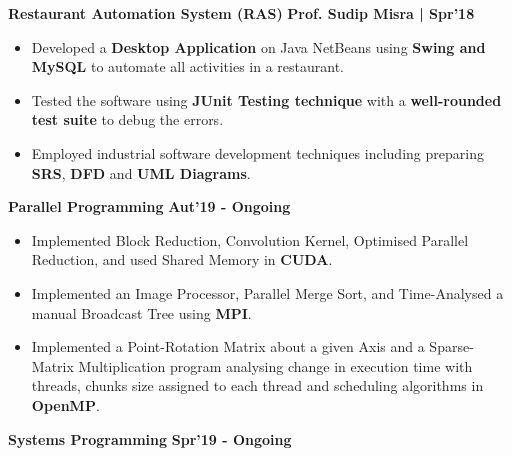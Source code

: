\documentclass[10pt]{article}
\begin{document}
\vspace{-0.2ex}
\large {\textbf{Restaurant Automation System (RAS)}} \normalsize \href{https://github.com/shmundhra/Restaurant-Automation-System} {\hspace{0.5ex}\faGithub} {\hfill} \textbf{Prof. Sudip Misra | Spr'18}\\[-1.75em]
\begin{itemize}
    \item Developed a \textbf{Desktop Application} on Java NetBeans using \textbf{Swing and MySQL} to automate all activities in a restaurant.\\[-1.9em]
    \item Tested the software using \textbf{JUnit Testing technique} with a \textbf{well-rounded test suite} to debug the errors.  \\[-1.9em] \item Employed industrial software development techniques including preparing \textbf{SRS}, \textbf{DFD} and \textbf{UML Diagrams}. 
    \\[-1em]
\end{itemize}
\vspace{-0.5ex}
\large {\textbf{Parallel Programming}} \normalsize \href{https://github.com/shmundhra/Parallel-Programming}{\faGithub} {\hfill}\textbf{Aut'19 - Ongoing}\\[-1.8em]
\begin{itemize}
    \item Implemented Block Reduction, Convolution Kernel, Optimised Parallel Reduction, and used Shared Memory in \textbf{CUDA}. \\[-1.9em]
    \item Implemented an Image Processor, Parallel Merge Sort, and Time-Analysed a manual Broadcast Tree using \textbf{MPI}. \\[-1.9em]
    \item Implemented a Point-Rotation Matrix about a given Axis and a Sparse-Matrix Multiplication program analysing change in execution time with threads, chunks size assigned to each thread and scheduling algorithms in \textbf{OpenMP}.\\[-1em]
\end{itemize}
\vspace{-0.5ex}
\large {\textbf{Systems Programming}} \normalsize \href{https://github.com/shmundhra/Systems-Programming}{\faGithub} {\hfill}\textbf{Spr'19 - Ongoing}\\[-1.8em]
\end{document}
